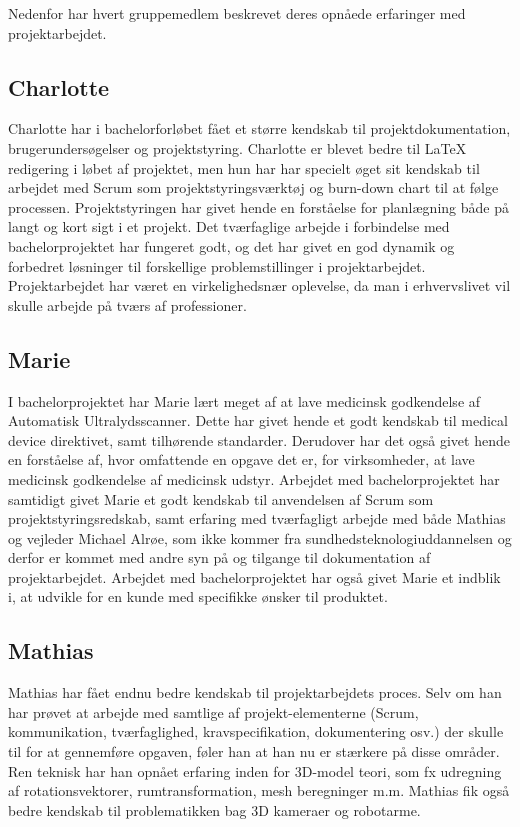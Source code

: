 Nedenfor har hvert gruppemedlem beskrevet deres opnåede erfaringer med projektarbejdet. 

\subsection{Charlotte}
Charlotte har i bachelorforløbet fået et større kendskab til projektdokumentation, brugerundersøgelser og projektstyring. Charlotte er blevet bedre til LaTeX redigering i løbet af projektet, men hun har har specielt øget sit kendskab til arbejdet med Scrum som projektstyringsværktøj og burn-down chart til at følge processen. Projektstyringen har givet hende en forståelse for planlægning både på langt og kort sigt i et projekt. Det tværfaglige arbejde i forbindelse med bachelorprojektet har fungeret godt, og det har givet en god dynamik og forbedret løsninger til forskellige problemstillinger i projektarbejdet. Projektarbejdet har været en virkelighedsnær oplevelse, da man i erhvervslivet vil skulle arbejde på tværs af professioner. 

\subsection{Marie}
I bachelorprojektet har Marie lært meget af at lave medicinsk godkendelse af Automatisk Ultralydsscanner. Dette har givet hende et godt kendskab til medical device direktivet, samt tilhørende standarder. Derudover har det også givet hende en forståelse af, hvor
omfattende en opgave det er, for virksomheder, at lave medicinsk godkendelse af medicinsk udstyr. Arbejdet med bachelorprojektet har samtidigt givet Marie et godt kendskab til anvendelsen af Scrum som projektstyringsredskab, samt erfaring med tværfagligt arbejde med både Mathias og vejleder Michael Alrøe, som ikke kommer fra sundhedsteknologiuddannelsen og derfor er kommet med andre syn på og tilgange til dokumentation af projektarbejdet. Arbejdet med bachelorprojektet har også givet Marie et indblik i, at udvikle for en kunde med specifikke ønsker til produktet. 

\subsection{Mathias}
Mathias har fået endnu bedre kendskab til projektarbejdets proces. Selv om han har prøvet at arbejde med samtlige af projekt-elementerne (Scrum, kommunikation, tværfaglighed, kravspecifikation, dokumentering osv.) der skulle til for at gennemføre opgaven, føler han at han nu er stærkere på disse områder. Ren teknisk har han opnået erfaring inden for 3D-model teori, som fx udregning af rotationsvektorer, rumtransformation, mesh beregninger m.m. Mathias fik også bedre kendskab til problematikken bag 3D kameraer og robotarme.

